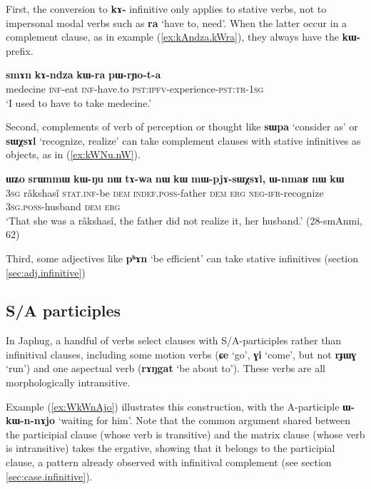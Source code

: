 \documentclass[oneside,a4paper,11pt]{article}
\newcommand{\ipa}[1]{\textbf{\phon#1}} %
\newcommand{\jpg}[2]{\ipa{#1} `#2'} %
\begin{document}
 First, the conversion to \ipa{kɤ-} infinitive only applies to stative verbs, not to  impersonal modal verbs such as \jpg{ra}{have to, need}. When the latter occur in a complement clause, as in example (\ref{ex:kAndza.kWra}), they always have the \ipa{kɯ-} prefix.

\begin{exe}
\ex \label{ex:kAndza.kWra}
\gll 
\ipa{smɤn} 	\ipa{kɤ-ndza} 	\ipa{kɯ-ra} 	\ipa{pɯ-rɲo-t-a} \\ 
medecine \textsc{inf}-eat \textsc{inf}-have.to  \textsc{pst:ipfv}-experience-\textsc{pst:tr-1sg} \\
\glt  `I used to have to take medecine.' 
\end{exe}
 
 Second, complements of verb of perception or thought like \jpg{sɯpa}{consider as} or \jpg{sɯχsɤl}{recognize, realize} can take complement clauses with stative infinitives as objects, as in (\ref{ex:kWNu.nW}).
\begin{exe}
\ex \label{ex:kWNu.nW}
\gll \ipa{ɯʑo} 	\ipa{srɯnmɯ} 	\ipa{kɯ-ŋu} 	\ipa{nɯ} 	\ipa{tɤ-wa} 	\ipa{nɯ} 	\ipa{kɯ} 	\ipa{mɯ-pjɤ-sɯχsɤl,} 	\ipa{ɯ-nmaʁ} 	\ipa{nɯ} 	\ipa{kɯ} \\
\textsc{3sg} râkshasî \textsc{stat.inf}-be \textsc{dem} \textsc{indef.poss}-father \textsc{dem} \textsc{erg} \textsc{neg-ifr}-recognize \textsc{3sg.poss}-husband \textsc{dem} \textsc{erg} \\
\glt  `That she was a râkshasî, the father did not realize it, her husband.' (28-smAnmi, 62)
\end{exe}

Third, some adjectives like \jpg{pʰɤn}{be efficient} can take stative infinitives (section \ref{sec:adj.infinitive})

 \subsection{S/A participles} \label{sec:SApart}
In Japhug, a handful of verbs select clauses with S/A-participles rather than infinitival clauses, including  some motion verbs (\jpg{ɕe}{go}, \jpg{ɣi}{come}, but not \jpg{rɟɯɣ}{run}) and one aspectual verb  (\jpg{rɤŋgat}{be about to}). These verbs are all morphologically intransitive.

Example (\ref{ex:WkWnAjo}) illustrates this construction, with the A-participle \ipa{ɯ-kɯ-n-nɤjo} `waiting for him'. Note that the common argument shared between the participial clause (whose verb is transitive) and the matrix clause (whose verb is intransitive) takes the ergative, showing that it belongs to the participial clause, a pattern already observed with infinitival complement (see section \ref{sec:case.infinitive}).
\end{document}
